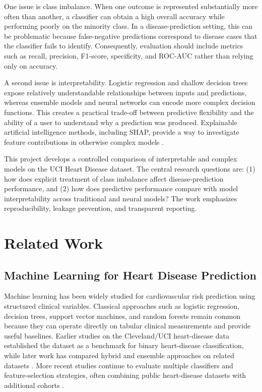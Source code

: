 \documentclass[10pt]{article}
\begin{document}
One issue is class imbalance. When one outcome is represented substantially more often than another, a classifier can obtain a high overall accuracy while performing poorly on the minority class. In a disease-prediction setting, this can be problematic because false-negative predictions correspond to disease cases that the classifier fails to identify. Consequently, evaluation should include metrics such as recall, precision, F1-score, specificity, and ROC-AUC rather than relying only on accuracy.

A second issue is interpretability. Logistic regression and shallow decision trees expose relatively understandable relationships between inputs and predictions, whereas ensemble models and neural networks can encode more complex decision functions. This creates a practical trade-off between predictive flexibility and the ability of a user to understand why a prediction was produced. Explainable artificial intelligence methods, including SHAP, provide a way to investigate feature contributions in otherwise complex models \citep{lundberg2017unified}.

This project develops a controlled comparison of interpretable and complex models on the UCI Heart Disease dataset. The central research questions are: (1) how does explicit treatment of class imbalance affect disease-prediction performance, and (2) how does predictive performance compare with model interpretability across traditional and neural models? The work emphasizes reproducibility, leakage prevention, and transparent reporting.

\section{Related Work}

\subsection{Machine Learning for Heart Disease Prediction}
Machine learning has been widely studied for cardiovascular risk prediction using structured clinical variables. Classical approaches such as logistic regression, decision trees, support vector machines, and random forests remain common because they can operate directly on tabular clinical measurements and provide useful baselines. Earlier studies on the Cleveland/UCI heart-disease data established the dataset as a benchmark for binary heart-disease classification, while later work has compared hybrid and ensemble approaches on related datasets \citep{alizadehsani2013data,haq2018hybrid,mohan2019effective,dwivedi2018performance}. More recent studies continue to evaluate multiple classifiers and feature-selection strategies, often combining public heart-disease datasets with additional cohorts \citep{alshaikh2024comprehensive,elsofany2024proposed,abdullah2024explainable}.
\end{document}
